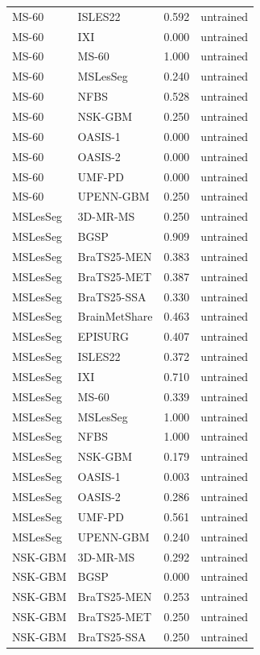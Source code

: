 \begin{tabular}{llrl}
MS-60 & ISLES22 & 0.592 & untrained \\
MS-60 & IXI & 0.000 & untrained \\
MS-60 & MS-60 & 1.000 & untrained \\
MS-60 & MSLesSeg & 0.240 & untrained \\
MS-60 & NFBS & 0.528 & untrained \\
MS-60 & NSK-GBM & 0.250 & untrained \\
MS-60 & OASIS-1 & 0.000 & untrained \\
MS-60 & OASIS-2 & 0.000 & untrained \\
MS-60 & UMF-PD & 0.000 & untrained \\
MS-60 & UPENN-GBM & 0.250 & untrained \\
MSLesSeg & 3D-MR-MS & 0.250 & untrained \\
MSLesSeg & BGSP & 0.909 & untrained \\
MSLesSeg & BraTS25-MEN & 0.383 & untrained \\
MSLesSeg & BraTS25-MET & 0.387 & untrained \\
MSLesSeg & BraTS25-SSA & 0.330 & untrained \\
MSLesSeg & BrainMetShare & 0.463 & untrained \\
MSLesSeg & EPISURG & 0.407 & untrained \\
MSLesSeg & ISLES22 & 0.372 & untrained \\
MSLesSeg & IXI & 0.710 & untrained \\
MSLesSeg & MS-60 & 0.339 & untrained \\
MSLesSeg & MSLesSeg & 1.000 & untrained \\
MSLesSeg & NFBS & 1.000 & untrained \\
MSLesSeg & NSK-GBM & 0.179 & untrained \\
MSLesSeg & OASIS-1 & 0.003 & untrained \\
MSLesSeg & OASIS-2 & 0.286 & untrained \\
MSLesSeg & UMF-PD & 0.561 & untrained \\
MSLesSeg & UPENN-GBM & 0.240 & untrained \\
NSK-GBM & 3D-MR-MS & 0.292 & untrained \\
NSK-GBM & BGSP & 0.000 & untrained \\
NSK-GBM & BraTS25-MEN & 0.253 & untrained \\
NSK-GBM & BraTS25-MET & 0.250 & untrained \\
NSK-GBM & BraTS25-SSA & 0.250 & untrained \\

\end{tabular}
